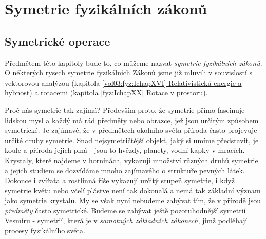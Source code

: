 \setchaptertoc
\chapter{Symetrie fyzikálních zákonů}\label{fyz:IchapLII}
  \section{Symetrické operace}\label{fyz:IchapLIIsecI}
    Předmětem této kapitoly bude to, co můžeme nazvat \emph{symetrie fyzikálních zákonů}. O
    některých rysech symetrie fyzikálních Zákonů jsme již mluvili v souvislostí s vektorovou
    analýzou (kapitola \hyperref[vol03:fyz:IchapXVI]{\ref*{vol03:fyz:IchapXVI} Relativistická
    energie a hybnost}) a rotacemi (kapitola \hyperref[fyz:IchapXX]{\ref*{fyz:IchapXX} Rotace v
    prostoru}).

    Proč nás symetrie tak zajímá? Především proto, že symetrie přímo fascinuje lidskou mysl a každý
    má rád předměty nebo obrazce, jež jsou určitým způsobem symetrické. Je zajímavé, že v předmětech
    okolního světa příroda často projevuje určité druhy symetrie. Snad nejsymetričtější objekt, jaký
    si umíme představit, je koule a příroda jejich plná - jsou to hvězdy, planety, vodní kapky v
    mracích. Krystaly, které najdeme v horninách, vykazují množství různých druhů symetrie a jejich
    studiem se dozvídáme mnoho zajímavého o struktuře pevných látek. Dokonce i zvířata a rostlinná
    říše vykazují určitý stupeň symetrie, i když symetrie květu nebo včelí plástve není tak dokonalá
    a nemá tak základní význam jako symetrie krystalu. My se však nyní nebudeme zabývat tím, že v
    přírodě jsou \emph{předměty} často symetrické. Budeme se zabývat ještě pozoruhodnější symetrií
    Vesmíru - symetrií, která je v \emph{samotných základních zákonech}, jimž podléhají procesy
    fyzikálního světa.
    
